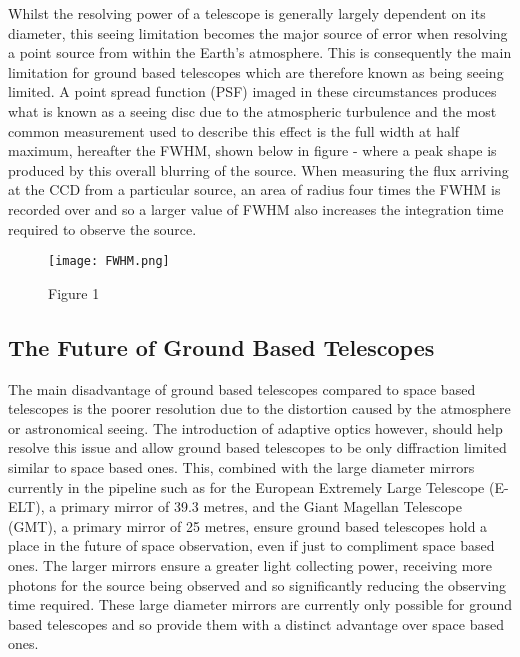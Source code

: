 \documentclass[pdf,color]{UoBnote}
\begin{document}
\noindent
Whilst the resolving power of a telescope is generally largely dependent on its diameter, this seeing limitation becomes the major source of error when resolving a point source from within the Earth’s atmosphere. This is consequently the main limitation for ground based telescopes which are therefore known as being seeing limited. A point spread function (PSF) imaged in these circumstances produces what is known as a seeing disc due to the atmospheric turbulence and the most common measurement used to describe this effect is the full width at half maximum, hereafter the FWHM, shown below in figure - where a peak shape is produced by this overall blurring of the source. When measuring the flux arriving at the CCD from a particular source, an area of radius four times the FWHM is recorded over and so a larger value of FWHM also increases the integration time required to observe the source. \\
\newline
\begin{figure}[H]
\begin{center}
\texttt{[image: FWHM.png]}
\end{center}
\caption{Figure 1}\label{fig:figure1}
\end{figure}
\noindent

\subsection{The Future of Ground Based Telescopes}
The main disadvantage of ground based telescopes compared to space based telescopes is the poorer resolution due to the distortion caused by the atmosphere or astronomical seeing. The introduction of adaptive optics however, should help resolve this issue and allow ground based telescopes to be only diffraction limited similar to space based ones. This, combined with the large diameter mirrors currently in the pipeline such as for the European Extremely Large Telescope (E-ELT), a primary mirror of 39.3 metres, and the Giant Magellan Telescope (GMT), a primary mirror of 25 metres, ensure ground based telescopes hold a place in the future of space observation, even if just to compliment space based ones. The larger mirrors ensure a greater light collecting power, receiving more photons for the source being observed and so significantly reducing the observing time required. These large diameter mirrors are currently only possible for ground based telescopes and so provide them with a distinct advantage over space based ones. \\
\end{document}
